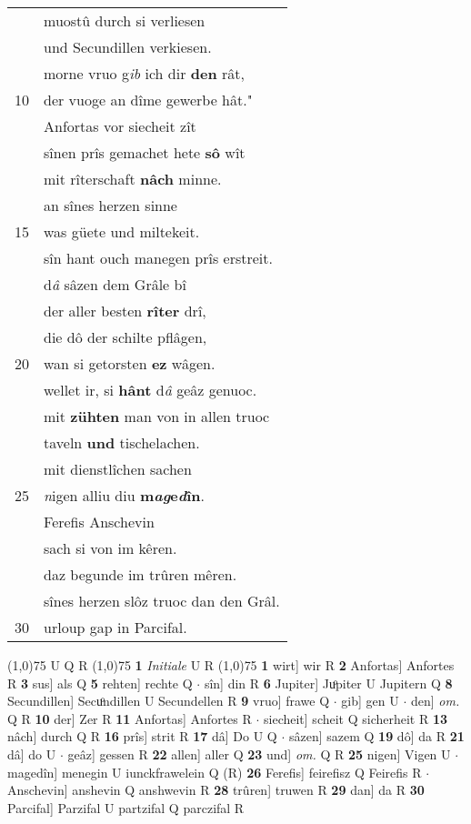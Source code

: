 \documentclass[8pt,a4paper,notitlepage]{article}
\begin{document}
\begin{table}[ht]
\begin{minipage}[t]{0.5\linewidth}
\begin{tabular}{rl}
 & muostû durch si verliesen\\ 
 & und Secundillen verkiesen.\\ 
 & morne vruo g\textit{ib} ich dir \textbf{den} rât,\\ 
10 & der vuoge an dîme gewerbe hât."\\ 
 & Anfortas vor siecheit zît\\ 
 & sînen prîs gemachet hete \textbf{sô} wît\\ 
 & mit rîterschaft \textbf{nâch} minne.\\ 
 & an sînes herzen sinne\\ 
15 & was güete und miltekeit.\\ 
 & sîn hant ouch manegen prîs erstreit.\\ 
 & d\textit{â} sâzen dem Grâle bî\\ 
 & der aller besten \textbf{rîter} drî,\\ 
 & die dô der schilte pflâgen,\\ 
20 & wan si getorsten \textbf{ez} wâgen.\\ 
 & wellet ir, si \textbf{hânt} d\textit{â} geâz genuoc.\\ 
 & mit \textbf{zühten} man von in allen truoc\\ 
 & taveln \textbf{und} tischelachen.\\ 
 & mit dienstlîchen sachen\\ 
25 & \textit{n}igen alliu diu \textbf{m\textit{ag}e\textit{d}în}.\\ 
 & Ferefis Anschevin\\ 
 & sach si von im kêren.\\ 
 & daz begunde im trûren mêren.\\ 
 & sînes herzen slôz truoc dan den Grâl.\\ 
30 & urloup gap in Parcifal.\\ 
\end{tabular}
\scriptsize
\line(1,0){75} \newline
U Q R \newline
\line(1,0){75} \newline
\textbf{1} \textit{Initiale} U R  \newline
\line(1,0){75} \newline
\textbf{1} wirt] wir R \textbf{2} Anfortas] Anfortes R \textbf{3} sus] als Q \textbf{5} rehten] rechte Q  $\cdot$ sîn] din R \textbf{6} Jupiter] Juͦpiter U Jupitern Q \textbf{8} Secundillen] Secuͦndillen U Secundellen R \textbf{9} vruo] frawe Q  $\cdot$ gib] gen U  $\cdot$ den] \textit{om.} Q R \textbf{10} der] Zer R \textbf{11} Anfortas] Anfortes R  $\cdot$ siecheit] scheit Q sicherheit R \textbf{13} nâch] durch Q R \textbf{16} prîs] strit R \textbf{17} dâ] Do U Q  $\cdot$ sâzen] sazem Q \textbf{19} dô] da R \textbf{21} dâ] do U  $\cdot$ geâz] gessen R \textbf{22} allen] aller Q \textbf{23} und] \textit{om.} Q R \textbf{25} nigen] Vigen U  $\cdot$ magedîn] menegin U iunckfrawelein Q (R) \textbf{26} Ferefis] feirefisz Q Feirefis R  $\cdot$ Anschevin] anshevin Q anshwevin R \textbf{28} trûren] truwen R \textbf{29} dan] da R \textbf{30} Parcifal] Parzifal U partzifal Q parczifal R \newline

\end{minipage}
\end{table}
\end{document}
